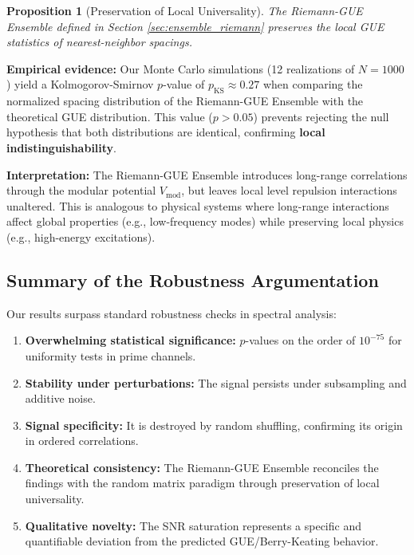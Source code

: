\documentclass[12pt, a4paper]{article}
\theoremstyle{plain}
\newtheorem{proposicion}[teorema]{Proposition}
\theoremstyle{definition}
\theoremstyle{remark}
\begin{document}
\begin{proposicion}[Preservation of Local Universality]
The Riemann-GUE Ensemble defined in Section \ref{sec:ensemble_riemann} preserves the local GUE statistics of nearest-neighbor spacings.
\end{proposicion}

\textbf{Empirical evidence:} Our Monte Carlo simulations (12 realizations of $N=1000$) yield a Kolmogorov-Smirnov $p$-value of $p_{\text{KS}} \approx 0.27$ when comparing the normalized spacing distribution of the Riemann-GUE Ensemble with the theoretical GUE distribution. This value ($p > 0.05$) prevents rejecting the null hypothesis that both distributions are identical, confirming \textbf{local indistinguishability}.

\textbf{Interpretation:} The Riemann-GUE Ensemble introduces long-range correlations through the modular potential $V_{\text{mod}}$, but leaves local level repulsion interactions unaltered. This is analogous to physical systems where long-range interactions affect global properties (e.g., low-frequency modes) while preserving local physics (e.g., high-energy excitations).

\subsection{Summary of the Robustness Argumentation}
\label{subsec:resumen_robustez}

Our results surpass standard robustness checks in spectral analysis:

\begin{enumerate}[label=\arabic*., leftmargin=*, align=left]
    \item \textbf{Overwhelming statistical significance:} $p$-values on the order of $10^{-75}$ for uniformity tests in prime channels.
    
    \item \textbf{Stability under perturbations:} The signal persists under subsampling and additive noise.
    
    \item \textbf{Signal specificity:} It is destroyed by random shuffling, confirming its origin in ordered correlations.
    
    \item \textbf{Theoretical consistency:} The Riemann-GUE Ensemble reconciles the findings with the random matrix paradigm through preservation of local universality.
    
    \item \textbf{Qualitative novelty:} The SNR saturation represents a specific and quantifiable deviation from the predicted GUE/Berry-Keating behavior.
\end{enumerate}
\end{document}
